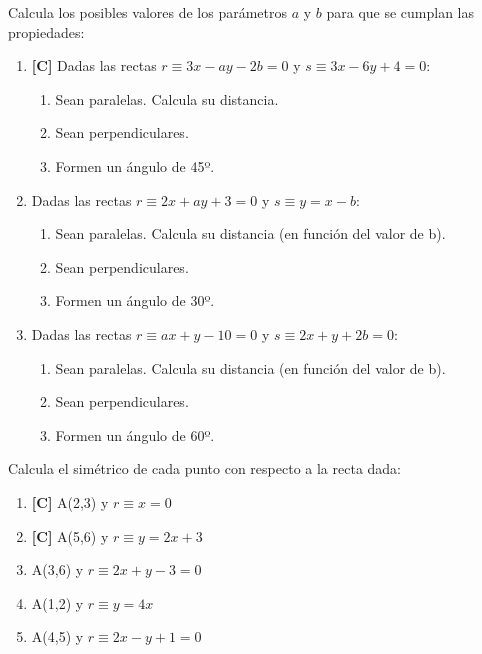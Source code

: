 \Exercicio Calcula los posibles valores de los parámetros $a$ y $b$ para que se cumplan las propiedades:
\begin{enumerate}[topsep=0pt]
	\item \textbf{[C]} Dadas las rectas $r \equiv 3x-ay -2b = 0$ y $s \equiv 3x-6y +4 = 0$:
	\begin{enumerate}[topsep=0pt, label=\arabic*)]
		\item Sean paralelas. Calcula su distancia.
		\item Sean perpendiculares.
		\item Formen un ángulo de 45º.
	\end{enumerate}

	\item Dadas las rectas $r \equiv 2x + ay + 3 = 0$ y $s \equiv y = x - b$:
	\begin{enumerate}[topsep=0pt, label=\arabic*)]
		\item Sean paralelas. Calcula su distancia (en función del valor de b).
		\item Sean perpendiculares.
		\item Formen un ángulo de 30º.
	\end{enumerate}

	\item Dadas las rectas $r \equiv ax + y - 10 = 0$ y $s \equiv 2x + y + 2b = 0$:
	\begin{enumerate}[topsep=0pt, label=\arabic*)]
		\item Sean paralelas. Calcula su distancia (en función del valor de b).
		\item Sean perpendiculares.
		\item Formen un ángulo de 60º.
	\end{enumerate}

\end{enumerate}



\Exercicio Calcula el simétrico de cada punto con respecto a la recta dada:

\begin{enumerate}[topsep=0pt]
	\item \textbf{[C]} A(2,3) y $ r \equiv x = 0 $
	\item \textbf{[C]} A(5,6) y $ r \equiv y = 2x + 3 $
	
	\item A(3,6) y $ r \equiv 2x + y -3 = 0 $
	\item A(1,2) y $ r \equiv y = 4x $
	\item A(4,5) y $ r \equiv 2x - y + 1 = 0 $
\end{enumerate}


